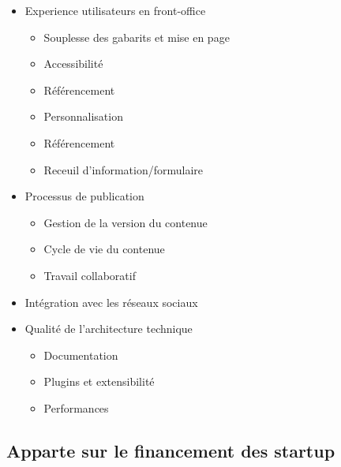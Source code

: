 \documentclass[11pt, a4paper ]{article}
\begin{document}
\begin{spacing}{1.5}
\begin{itemize}
	\item Experience utilisateurs en front-office
		\begin{itemize}
			\item Souplesse des gabarits et mise en page

			\item Accessibilité

			\item Référencement

			\item Personnalisation

			\item Référencement

			\item Receuil d'information/formulaire

		\end{itemize}

	\item Processus de publication
		\begin{itemize}
			\item Gestion de la version du contenue

			\item Cycle de vie du contenue

			\item Travail collaboratif

		\end{itemize}

	\item Intégration avec les réseaux sociaux

	\item Qualité de l'architecture technique
		\begin{itemize}
			\item Documentation

			\item Plugins et extensibilité

			\item Performances

		\end{itemize}

\end{itemize}

		\subsection{Apparte sur le financement des startup}


\end{spacing}
\end{document}
